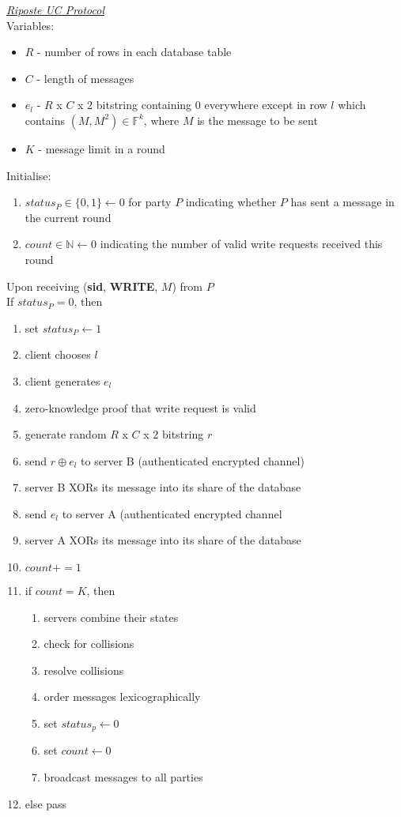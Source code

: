 \begin{tcolorbox}[enhanced, colback=white, arc=5pt, breakable]
\noindent\emph{\underline{Riposte UC Protocol}}\\[5pt]
Variables:
\begin{itemize}
    \item $R$ - number of rows in each database table
    \item $C$ - length of messages
    \item $e_l$ - $R$ x $C$ x 2 bitstring containing 0 everywhere except in row $l$ which contains $(M, M^2)\in \mathbb{F}^k$, where $M$ is the message to be sent
    \item $K$ - message limit in a round
\end{itemize}
 Initialise:
 \begin{enumerate}
     \item $status_P\in\{0,1\}\leftarrow 0$ for party $P$ indicating whether $P$ has sent a message in the current round
     \item $count\in\mathbb{N}\leftarrow 0$ indicating the number of valid write requests received this round
 \end{enumerate}
 
 
\extitem Upon receiving (\textbf{sid}, \textbf{WRITE}, $M$) from $P$\\
If $status_P=0$, then
\begin{enumerate}
    \item set $status_P\leftarrow 1$
    \item client chooses $l$
    \item client generates $e_l$
    \item zero-knowledge proof that write request is valid
    \item generate random $R$ x $C$ x 2 bitstring $r$
    \item send $r\oplus e_l$ to server B (authenticated encrypted channel)
    \item server B XORs its message into its share of the database
    \item send $e_l$ to server A (authenticated encrypted channel
    \item server A XORs its message into its share of the database
    \item $count += 1$
    \item if $count=K$, then
    \begin{enumerate}
        \item servers combine their states
        \item check for collisions
        \item resolve collisions
        \item order messages lexicographically
        \item set $status_p\leftarrow0$
        \item set $count \leftarrow 0$
        \item broadcast messages to all parties
    \end{enumerate}
    \item else pass
\end{enumerate}

\end{tcolorbox}
\label{fig:riposte_protocol}